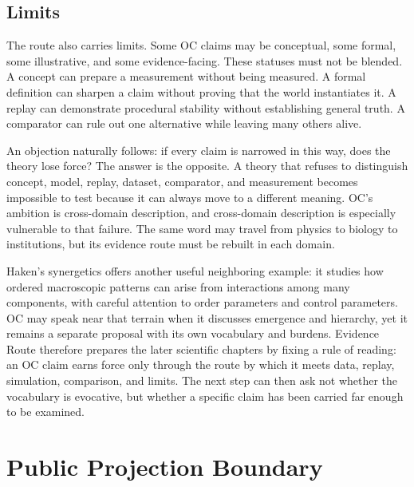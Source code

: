 \documentclass[11pt,a4paper,openany]{book}
\begin{document}
\subsection{Limits}
The route also carries limits. Some OC claims may be conceptual, some formal, some illustrative, and some evidence-facing. These statuses must not be blended. A concept can prepare a measurement without being measured. A formal definition can sharpen a claim without proving that the world instantiates it. A replay can demonstrate procedural stability without establishing general truth. A comparator can rule out one alternative while leaving many others alive. \cite{wilson_renormalization,landau_stat_physics}\par
An objection naturally follows: if every claim is narrowed in this way, does the theory lose force? The answer is the opposite. A theory that refuses to distinguish concept, model, replay, dataset, comparator, and measurement becomes impossible to test because it can always move to a different meaning. OC's ambition is cross-domain description, and cross-domain description is especially vulnerable to that failure. The same word may travel from physics to biology to institutions, but its evidence route must be rebuilt in each domain.\par
Haken's synergetics offers another useful neighboring example: it studies how ordered macroscopic patterns can arise from interactions among many components, with careful attention to order parameters and control parameters. OC may speak near that terrain when it discusses emergence and hierarchy, yet it remains a separate proposal with its own vocabulary and burdens. Evidence Route therefore prepares the later scientific chapters by fixing a rule of reading: an OC claim earns force only through the route by which it meets data, replay, simulation, comparison, and limits. The next step can then ask not whether the vocabulary is evocative, but whether a specific claim has been carried far enough to be examined.\par
\section{Public Projection Boundary}
\end{document}
